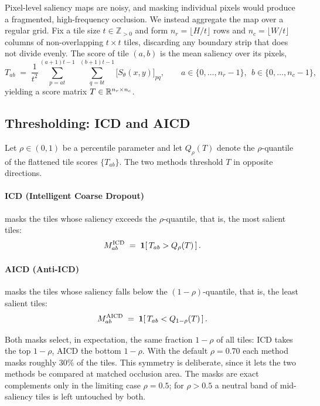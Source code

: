 Pixel-level saliency maps are noisy, and masking individual pixels would
produce a fragmented, high-frequency occlusion.  We instead aggregate the map
over a regular grid.  Fix a tile size $t \in \mathbb{Z}_{>0}$ and form
$n_r = \lfloor H/t \rfloor$ rows and $n_c = \lfloor W/t \rfloor$ columns of
non-overlapping $t \times t$ tiles, discarding any boundary strip that does not
divide evenly.  The score of tile $(a,b)$ is the mean saliency over its pixels,
\begin{equation}
  T_{ab}
  \;=\;
  \frac{1}{t^2}
  \sum_{p=at}^{(a+1)t - 1} \;\sum_{q=bt}^{(b+1)t - 1}
  \big[ S_\theta(x,y) \big]_{pq},
  \qquad
  a \in \{0,\dots,n_r{-}1\},\;\,
  b \in \{0,\dots,n_c{-}1\},
  \label{eq:tilescore}
\end{equation}
yielding a score matrix $T \in \mathbb{R}^{n_r \times n_c}$.

\subsection{Thresholding: ICD and AICD}
\label{sec:method:threshold}

Let $\rho \in (0,1)$ be a percentile parameter and let $Q_\rho(T)$ denote the
$\rho$-quantile of the flattened tile scores $\{T_{ab}\}$.  The two methods
threshold $T$ in opposite directions.

\paragraph{ICD (Intelligent Coarse Dropout)} masks the tiles whose saliency
exceeds the $\rho$-quantile, that is, the most salient tiles:
\begin{equation}
  M^{\mathrm{ICD}}_{ab}
  \;=\;
  \mathbf{1}\!\left[\, T_{ab} > Q_\rho(T) \,\right].
  \label{eq:icdmask}
\end{equation}

\paragraph{AICD (Anti-ICD)} masks the tiles whose saliency falls below the
$(1{-}\rho)$-quantile, that is, the least salient tiles:
\begin{equation}
  M^{\mathrm{AICD}}_{ab}
  \;=\;
  \mathbf{1}\!\left[\, T_{ab} < Q_{1-\rho}(T) \,\right].
  \label{eq:aicdmask}
\end{equation}

Both masks select, in expectation, the same fraction $1-\rho$ of all tiles:
ICD takes the top $1-\rho$, AICD the bottom $1-\rho$.  With the default
$\rho = 0.70$ each method masks roughly $30\%$ of the tiles.  This symmetry is
deliberate, since it lets the two methods be compared at matched occlusion area.
The masks are exact complements only in the limiting case $\rho = 0.5$; for
$\rho > 0.5$ a neutral band of mid-saliency tiles is left untouched by both.

